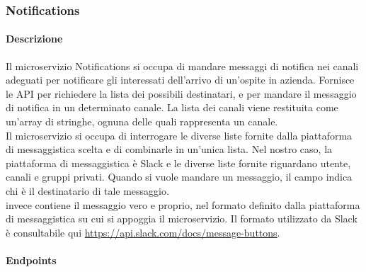 \subsubsection{Notifications}
\paragraph{Descrizione}
Il microservizio Notifications si occupa di mandare messaggi di notifica nei canali adeguati per notificare gli interessati dell'arrivo di un'ospite in azienda. Fornisce le API per richiedere la lista dei possibili destinatari, e per mandare il messaggio di notifica in un determinato canale. La lista dei canali viene restituita come un'array di stringhe, ognuna delle quali rappresenta un canale.\\
Il microservizio si occupa di interrogare le diverse liste fornite dalla piattaforma di messaggistica scelta e di combinarle in un'unica lista. Nel nostro caso, la piattaforma di messaggistica è Slack e le diverse liste fornite riguardano utente, canali e gruppi privati. Quando si vuole mandare un messaggio, il campo  indica chi è il destinatario di tale messaggio.\\  invece contiene il messaggio vero e proprio, nel formato definito dalla piattaforma di messaggistica su cui si appoggia il microservizio. Il formato utilizzato da Slack è consultabile qui \url{https://api.slack.com/docs/message-buttons}.
\paragraph{Endpoints}

